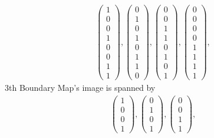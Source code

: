 \documentclass[8pt]{article}
\begin{document}
 \begin{align*} \left(\begin{array}{r}
1 \\
0 \\
0 \\
1 \\
0 \\
0 \\
1 \\
1
\end{array}\right) ,
 \left(\begin{array}{r}
0 \\
1 \\
0 \\
1 \\
0 \\
1 \\
1 \\
0
\end{array}\right) ,
 \left(\begin{array}{r}
0 \\
0 \\
1 \\
1 \\
0 \\
1 \\
0 \\
1
\end{array}\right) ,
 \left(\begin{array}{r}
0 \\
0 \\
0 \\
0 \\
1 \\
1 \\
1 \\
1
\end{array}\right) ,
 \end{align*}
 3th Boundary Map's image is spanned by
 \begin{align*} \left(\begin{array}{r}
1 \\
0 \\
0 \\
1
\end{array}\right) ,
 \left(\begin{array}{r}
0 \\
1 \\
0 \\
1
\end{array}\right) ,
 \left(\begin{array}{r}
0 \\
0 \\
1 \\
1
\end{array}\right) ,
 \end{align*}
 
\end{document}
